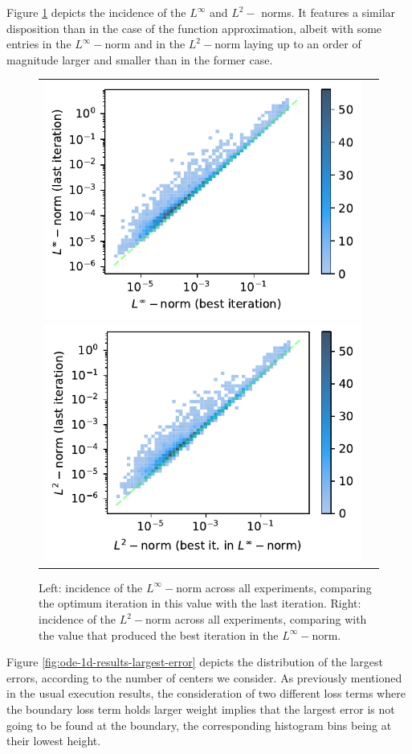 \documentclass[12pt]{report} %
\begin{document}
Figure \ref{fig:ode-1d-results-incidence-l-norms} depicts the incidence of the $L^\infty$ and $L^2-$ norms. It features a similar disposition than in the case of the function approximation, albeit with some entries in the $L^\infty-$norm and in the $L^2-$norm laying up to an order of magnitude larger and smaller than in the former case.

\begin{figure}[h]
  \hspace*{-2cm}
  \begin{tabular}{cc}
    \includegraphics[width=.6\textwidth]{imagenes/experiments/1d/ode/incidence_of_linf.pdf}
    \includegraphics[width=.6\textwidth]{imagenes/experiments/1d/ode/incidence_of_l2.pdf}
  \end{tabular}
  \caption{Left: incidence of the $L^\infty-$norm across all experiments, comparing the optimum iteration in this value with the last iteration. Right: incidence of the $L^2-$norm across all experiments, comparing with the value that produced the best iteration in the $L^\infty-$norm.}
  \label{fig:ode-1d-results-incidence-l-norms}
\end{figure}

Figure \ref{fig:ode-1d-results-largest-error} depicts the distribution of the largest errors, according to the number of centers we consider. As previously mentioned in the usual execution results, the consideration of two different loss terms where the boundary loss term holds larger weight implies that the largest error is not going to be found at the boundary, the corresponding histogram bins being at their lowest height.
\end{document}
